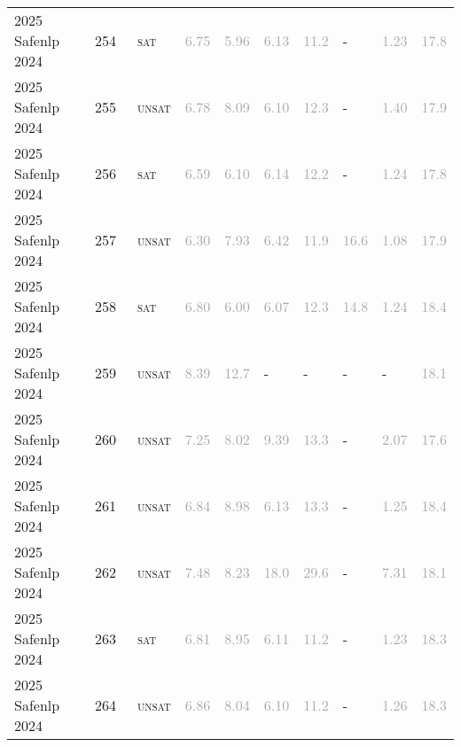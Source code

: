 \begin{center}
{\begin{longtable}{@{}llllllllll@{}}
2025 Safenlp 2024 & 254 & ~\textsc{sat} & \textcolor{darkgray}{6.75} & \textcolor{darkgray}{5.96} & \textcolor{darkgray}{6.13} & \textcolor{darkgray}{11.2} & - & \textcolor{darkgray}{1.23} & \textcolor{darkgray}{17.8} \\
2025 Safenlp 2024 & 255 & ~\textsc{unsat} & \textcolor{darkgray}{6.78} & \textcolor{darkgray}{8.09} & \textcolor{darkgray}{6.10} & \textcolor{darkgray}{12.3} & - & \textcolor{darkgray}{1.40} & \textcolor{darkgray}{17.9} \\
2025 Safenlp 2024 & 256 & ~\textsc{sat} & \textcolor{darkgray}{6.59} & \textcolor{darkgray}{6.10} & \textcolor{darkgray}{6.14} & \textcolor{darkgray}{12.2} & - & \textcolor{darkgray}{1.24} & \textcolor{darkgray}{17.8} \\
2025 Safenlp 2024 & 257 & ~\textsc{unsat} & \textcolor{darkgray}{6.30} & \textcolor{darkgray}{7.93} & \textcolor{darkgray}{6.42} & \textcolor{darkgray}{11.9} & \textcolor{darkgray}{16.6} & \textcolor{darkgray}{1.08} & \textcolor{darkgray}{17.9} \\
2025 Safenlp 2024 & 258 & ~\textsc{sat} & \textcolor{darkgray}{6.80} & \textcolor{darkgray}{6.00} & \textcolor{darkgray}{6.07} & \textcolor{darkgray}{12.3} & \textcolor{darkgray}{14.8} & \textcolor{darkgray}{1.24} & \textcolor{darkgray}{18.4} \\
2025 Safenlp 2024 & 259 & ~\textsc{unsat} & \textcolor{darkgray}{8.39} & \textcolor{darkgray}{12.7} & - & - & - & - & \textcolor{darkgray}{18.1} \\
2025 Safenlp 2024 & 260 & ~\textsc{unsat} & \textcolor{darkgray}{7.25} & \textcolor{darkgray}{8.02} & \textcolor{darkgray}{9.39} & \textcolor{darkgray}{13.3} & - & \textcolor{darkgray}{2.07} & \textcolor{darkgray}{17.6} \\
2025 Safenlp 2024 & 261 & ~\textsc{unsat} & \textcolor{darkgray}{6.84} & \textcolor{darkgray}{8.98} & \textcolor{darkgray}{6.13} & \textcolor{darkgray}{13.3} & - & \textcolor{darkgray}{1.25} & \textcolor{darkgray}{18.4} \\
2025 Safenlp 2024 & 262 & ~\textsc{unsat} & \textcolor{darkgray}{7.48} & \textcolor{darkgray}{8.23} & \textcolor{darkgray}{18.0} & \textcolor{darkgray}{29.6} & - & \textcolor{darkgray}{7.31} & \textcolor{darkgray}{18.1} \\
2025 Safenlp 2024 & 263 & ~\textsc{sat} & \textcolor{darkgray}{6.81} & \textcolor{darkgray}{8.95} & \textcolor{darkgray}{6.11} & \textcolor{darkgray}{11.2} & - & \textcolor{darkgray}{1.23} & \textcolor{darkgray}{18.3} \\
2025 Safenlp 2024 & 264 & ~\textsc{unsat} & \textcolor{darkgray}{6.86} & \textcolor{darkgray}{8.04} & \textcolor{darkgray}{6.10} & \textcolor{darkgray}{11.2} & - & \textcolor{darkgray}{1.26} & \textcolor{darkgray}{18.3} \\

\end{longtable}}
\end{center}
